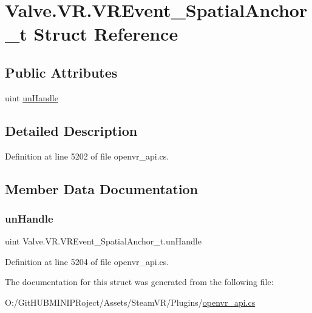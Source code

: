 \hypertarget{struct_valve_1_1_v_r_1_1_v_r_event___spatial_anchor__t}{}\section{Valve.\+V\+R.\+V\+R\+Event\+\_\+\+Spatial\+Anchor\+\_\+t Struct Reference}
\label{struct_valve_1_1_v_r_1_1_v_r_event___spatial_anchor__t}
\subsection*{Public Attributes}
\begin{DoxyCompactItemize}
\item 
uint \mbox{\hyperlink{struct_valve_1_1_v_r_1_1_v_r_event___spatial_anchor__t_a3da7e9c44981626ff840c4aa86e53ce6}{un\+Handle}}
\end{DoxyCompactItemize}


\subsection{Detailed Description}


Definition at line 5202 of file openvr\+\_\+api.\+cs.



\subsection{Member Data Documentation}
\mbox{\label{struct_valve_1_1_v_r_1_1_v_r_event___spatial_anchor__t_a3da7e9c44981626ff840c4aa86e53ce6}} 
\subsubsection{\texorpdfstring{unHandle}{unHandle}}
{\footnotesize\ttfamily uint Valve.\+V\+R.\+V\+R\+Event\+\_\+\+Spatial\+Anchor\+\_\+t.\+un\+Handle}



Definition at line 5204 of file openvr\+\_\+api.\+cs.



The documentation for this struct was generated from the following file\+:\begin{DoxyCompactItemize}
\item 
O\+:/\+Git\+H\+U\+B\+M\+I\+N\+I\+P\+Roject/\+Assets/\+Steam\+V\+R/\+Plugins/\mbox{\hyperlink{openvr__api_8cs}{openvr\+\_\+api.\+cs}}\end{DoxyCompactItemize}
